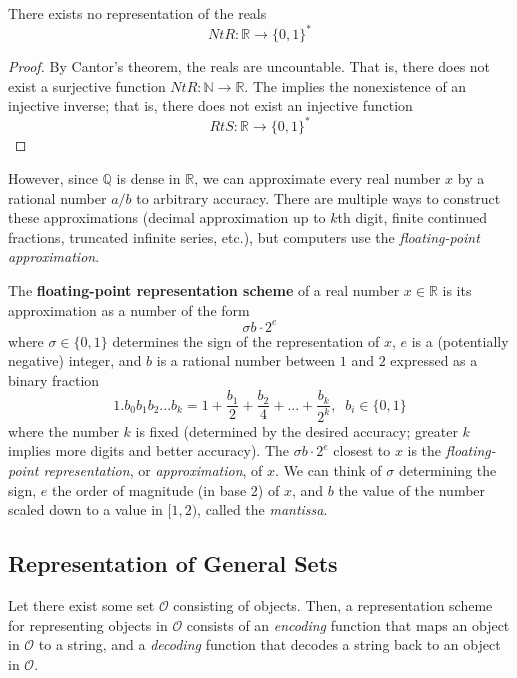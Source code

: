\documentclass{article}
\begin{document}
  \begin{theorem}
  There exists no representation of the reals
  \[NtR: \mathbb{R} \longrightarrow \{0, 1\}^*\]
  \end{theorem}
  \begin{proof}
  By Cantor's theorem, the reals are uncountable. That is, there does not exist a surjective function $NtR: \mathbb{N} \longrightarrow \mathbb{R}$. The implies the nonexistence of an injective inverse; that is, there does not exist an injective function 
  \[RtS: \mathbb{R} \longrightarrow \{0,1\}^*\]
  \end{proof}

  However, since $\mathbb{Q}$ is dense in $\mathbb{R}$, we can approximate every real number $x$ by a rational number $a/b$ to arbitrary accuracy. There are multiple ways to construct these approximations (decimal approximation up to $k$th digit, finite continued fractions, truncated infinite series, etc.), but computers use the \textit{floating-point approximation}. 

  \begin{definition}
  The \textbf{floating-point representation scheme} of a real number $x \in \mathbb{R}$ is its approximation as a number of the form 
  \[\sigma b \cdot 2^e\]
  where $\sigma \in \{0, 1\}$ determines the sign of the representation of $x$, $e$ is a (potentially negative) integer, and $b$ is a rational number between $1$ and $2$ expressed as a binary fraction 
  \[1.b_0 b_1 b_2 ... b_k = 1 + \frac{b_1}{2} + \frac{b_2}{4} + ... + \frac{b_k}{2^k}, \;\; b_i \in \{0,1\}\]
  where the number $k$ is fixed (determined by the desired accuracy; greater $k$ implies more digits and better accuracy). The $\sigma b \cdot 2^e$ closest to $x$ is the \textit{floating-point representation}, or \textit{approximation}, of $x$. We can think of $\sigma$ determining the sign, $e$ the order of magnitude (in base 2) of $x$, and $b$ the value of the number scaled down to a value in $[1,2)$, called the \textit{mantissa}. 
  \end{definition}

  \subsection{Representation of General Sets}
  Let there exist some set $\mathcal{O}$ consisting of objects. Then, a representation scheme for representing objects in $\mathcal{O}$ consists of an \textit{encoding} function that maps an object in $\mathcal{O}$ to a string, and a \textit{decoding} function that decodes a string back to an object in $\mathcal{O}$. 
\end{document}
